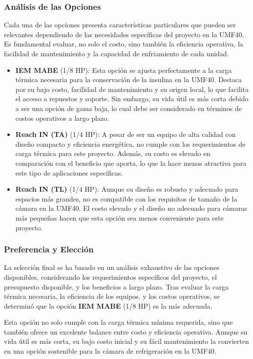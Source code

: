 \subsubsection{Análisis de las Opciones}
 Cada una de las opciones presenta características particulares que pueden ser relevantes dependiendo de las necesidades específicas del proyecto en la UMF40. Es fundamental evaluar, no solo el costo, sino también la eficiencia operativa, la facilidad de mantenimiento y la capacidad de enfriamiento de cada unidad.
 
 \begin{itemize}
 	\item \textbf{IEM MABE} (1/8 HP): Esta opción se ajusta perfectamente a la carga térmica necesaria para la conservación de la insulina en la UMF40. Destaca por su bajo costo, facilidad de mantenimiento y su origen local, lo que facilita el acceso a repuestos y soporte. Sin embargo, su vida útil es más corta debido a ser una opción de gama baja, lo cual debe ser considerado en términos de costos operativos a largo plazo.
 	\item \textbf{Reach IN (TA)} (1/4 HP): A pesar de ser un equipo de alta calidad con diseño compacto y eficiencia energética, no cumple con los requerimientos de carga térmica para este proyecto. Además, su costo es elevado en comparación con el beneficio que aporta, lo que la hace menos atractiva para este tipo de aplicaciones específicas.
 	\item \textbf{Reach IN (TL)} (1/4 HP): Aunque su diseño es robusto y adecuado para espacios más grandes, no es compatible con los requisitos de tamaño de la cámara en la UMF40. El costo elevado y el diseño no adecuado para cámaras más pequeñas hacen que esta opción sea menos conveniente para este proyecto.
 \end{itemize}
 
 \subsubsection{Preferencia y Elección}
 La selección final se ha basado en un análisis exhaustivo de las opciones disponibles, considerando los requerimientos específicos del proyecto, el presupuesto disponible, y los beneficios a largo plazo. Tras evaluar la carga térmica necesaria, la eficiencia de los equipos, y los costos operativos, se determinó que la opción \textbf{IEM MABE} (1/8 HP) es la más adecuada.
 
 Esta opción no solo cumple con la carga térmica mínima requerida, sino que también ofrece un excelente balance entre costo y eficiencia operativa. Aunque su vida útil es más corta, su bajo costo inicial y su fácil mantenimiento la convierten en una opción sostenible para la cámara de refrigeración en la UMF40.
 
